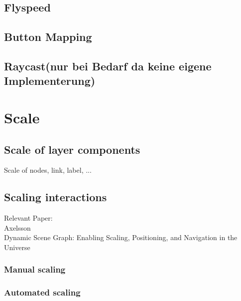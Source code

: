 \subsection{Flyspeed}
\subsection{Button Mapping}
\subsection{Raycast(nur bei Bedarf da keine eigene Implementerung)}

\section{Scale}
\subsection{Scale of layer components}
Scale of nodes, link, label, ...
\subsection{Scaling interactions}

Relevant Paper: \\
Axelsson\\
Dynamic Scene Graph: Enabling Scaling, Positioning, and Navigation in the Universe

\subsubsection{Manual scaling}
\subsubsection{Automated scaling}
